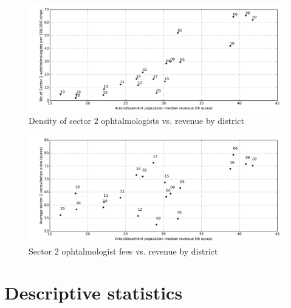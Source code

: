 \documentclass[11pt]{article}
\begin{document}
\begin{figure}[H]
    \caption{Density of sector 2 ophtalmologists vs. revenue by district}
	\centering
		\includegraphics[width=16cm]{images/Ophtalmo_Ardt_DensityS2VsRevenue.png}
\end{figure}

\begin{figure}[H]
    \caption{Sector 2 ophtalmologist fees vs. revenue by district}
	\centering
		\includegraphics[width=16cm]{images/Ophtalmo_Ardt_ConsultationS2VsRevenue.png}
\end{figure}

\clearpage

\appendix

\section{Descriptive statistics}
\end{document}
